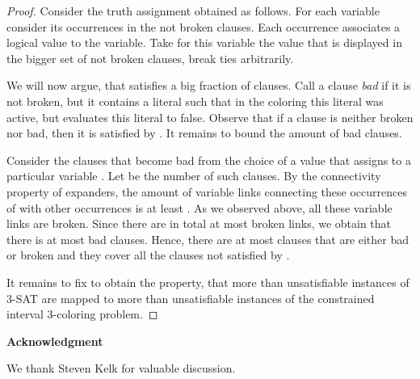 \documentclass[a4paper,11pt]{article}
\theoremstyle{theorem}
\begin{document}
\begin{proof}
Consider the truth assignment  obtained as follows. For each variable consider its occurrences
in the not broken clauses. Each occurrence associates a logical value to the variable.
Take for this variable the value that is displayed in the bigger set of not broken clauses,
break ties arbitrarily.

We will now argue, that  satisfies a big fraction of clauses.
Call a clause \emph{bad} if it is not broken, but it contains a literal
such that in the coloring  this literal was active, but  evaluates
this literal to false. Observe that if a clause is neither broken nor bad, then
it is satisfied by . It remains to bound the amount of bad clauses.

Consider the clauses that become bad from the choice of a value that 
assigns to a particular variable . Let  be the number of such clauses. 
By the connectivity property of expanders,
the amount of variable links connecting these occurrences of  with other occurrences
is at least . As we observed above, all these variable links are broken.
Since there are in total at most  broken links, we obtain that 
there is at most  bad clauses. Hence, there are at most
 clauses that are either bad or broken and they cover
all the clauses not satisfied by .

It remains to fix  to obtain the property,
that more than  unsatisfiable instances of 3-SAT are mapped to more than
 unsatisfiable instances of the constrained interval 3-coloring problem.
\end{proof}

\smallskip
\noindent
{\bf Acknowledgment}

\noindent
We thank Steven Kelk for valuable discussion. 



\end{document}
